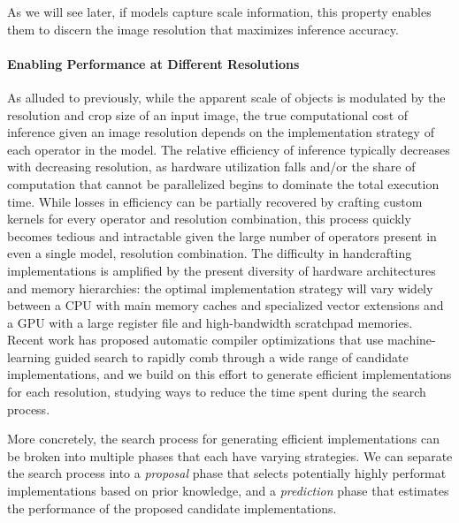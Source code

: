 As we will see later, if models capture scale information, this property enables them to discern the image resolution that maximizes inference accuracy.

\paragraph{Enabling Performance at Different Resolutions}
As alluded to previously, while the apparent scale of objects is modulated by the resolution and crop size of an input image, the true computational cost of inference given an image resolution depends on the implementation strategy of each operator in the model.
The relative efficiency of inference typically decreases with decreasing resolution, as hardware utilization falls and/or the share of computation that cannot be parallelized begins to dominate the total execution time.
While losses in efficiency can be partially recovered by crafting custom kernels for every operator and resolution combination, this process quickly becomes tedious and intractable given the large number of operators present in even a single model, resolution combination.
The difficulty in handcrafting implementations is amplified by the present diversity of hardware architectures and memory hierarchies: the optimal implementation strategy will vary widely between a CPU with main memory caches and specialized vector extensions and a GPU with a large register file and high-bandwidth scratchpad memories.
Recent work has proposed automatic compiler optimizations that use machine-learning guided search to rapidly comb through a wide range of candidate implementations, and we build on this effort to generate efficient implementations for each resolution, studying ways to reduce the time spent during the search process.

More concretely, the search process for generating efficient implementations can be broken into multiple phases that each have varying strategies.
We can separate the search process into a \emph{proposal} phase that selects potentially highly performat implementations based on prior knowledge, and a \emph{prediction} phase that estimates the performance of the proposed candidate implementations.


